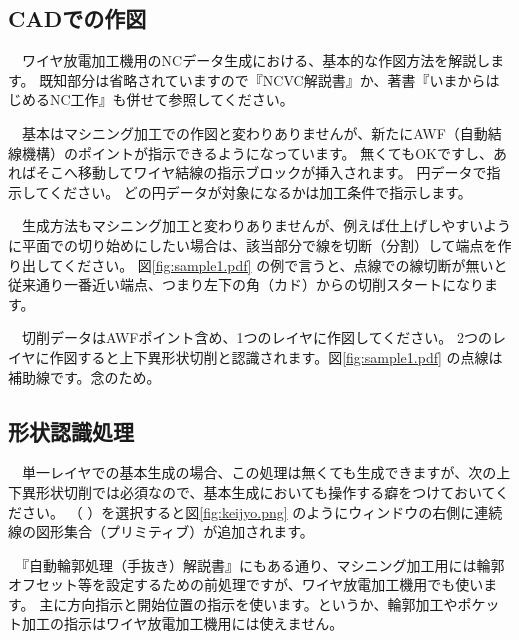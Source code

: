 

\subsection{CADでの作図}
　ワイヤ放電加工機用のNCデータ生成における、基本的な作図方法を解説します。
既知部分は省略されていますので『NCVC解説書』か、著書『いまからはじめるNC工作』も併せて参照してください。


　基本はマシニング加工での作図と変わりありませんが、新たにAWF（自動結線機構）のポイントが指示できるようになっています。
無くてもOKですし、あればそこへ移動してワイヤ結線の指示ブロックが挿入されます。
円データで指示してください。
どの円データが対象になるかは加工条件で指示します。

　生成方法もマシニング加工と変わりありませんが、例えば仕上げしやすいように平面での切り始めにしたい場合は、該当部分で線を切断（分割）して端点を作り出してください。
図\ref{fig:sample1.pdf} の例で言うと、点線での線切断が無いと従来通り一番近い端点、つまり左下の角（カド）からの切削スタートになります。

　切削データはAWFポイント含め、1つのレイヤに作図してください。
2つのレイヤに作図すると上下異形状切削と認識されます。図\ref{fig:sample1.pdf} の点線は補助線です。念のため。

\subsection{形状認識処理}
　単一レイヤでの基本生成の場合、この処理は無くても生成できますが、次の上下異形状切削では必須なので、基本生成においても操作する癖をつけておいてください。
（\,\,）を選択すると図\ref{fig:keijyo.png} のようにウィンドウの右側に連続線の図形集合（プリミティブ）が追加されます。

　『自動輪郭処理（手抜き）解説書』にもある通り、マシニング加工用には輪郭オフセット等を設定するための前処理ですが、ワイヤ放電加工機用でも使います。
主に方向指示と開始位置の指示を使います。というか、輪郭加工やポケット加工の指示はワイヤ放電加工機用には使えません。


